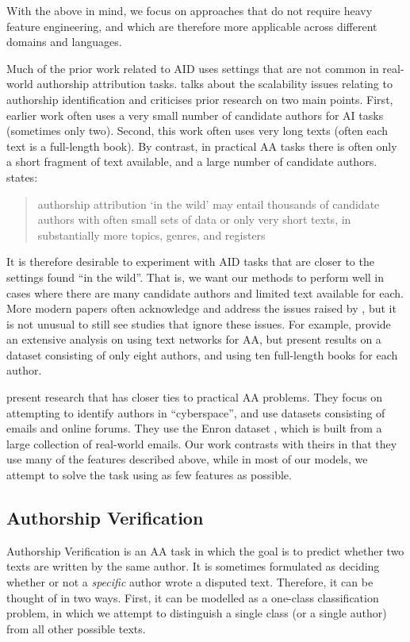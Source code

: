 With the above in mind, we focus on approaches that do not require heavy feature engineering, and which are therefore more applicable across different domains and languages.


Much of the prior work related to AID uses settings that are not common in real-world authorship attribution tasks. \citet{luyckx2011scalability} talks about the scalability issues relating to authorship identification and criticises prior research on two main points. First, earlier work often uses a very small number of candidate authors for AI tasks (sometimes only two). Second, this work often uses very long texts (often each text is a full-length book). By contrast, in practical AA tasks there is often only a short fragment of text available, and a large number of candidate authors. \citeauthor{luyckx2011scalability} states:

\begin{quote}authorship attribution `in the wild' may entail thousands of candidate authors with often small sets of data or only very short texts, in substantially more topics, genres, and registers\end{quote}

It is therefore desirable to experiment with AID tasks that are closer to the settings found ``in the wild''. That is, we want our methods to perform well in cases where there are many candidate authors and limited text available for each. More modern papers often acknowledge and address the issues raised by \citeauthor{luyckx2011scalability}, but it is not unusual to still see studies that ignore these issues. For example, \citet{akimushkin2017role} provide an extensive analysis on using text networks for AA, but present results on a dataset consisting of only eight authors, and using ten full-length books for each author.

\citet{abbasi2008writeprints} present research that has closer ties to practical AA problems. They focus on attempting to identify authors in ``cyberspace'', and use datasets consisting of emails and online forums. They use the Enron dataset \cite{klimt2004enron}, which is built from a large collection of real-world emails. Our work contrasts with theirs in that they use many of the features described above, while in most of our models, we attempt to solve the task using as few features as possible.


\subsection{Authorship Verification}
\label{authorship-verification}
Authorship Verification is an AA task in which the goal is to predict whether two texts are written by the same author. It is sometimes formulated as deciding whether or not a \textit{specific} author wrote a disputed text. Therefore, it can be thought of in two ways. First, it can be modelled as a one-class classification problem, in which we attempt to distinguish a single class (or a single author) from all other possible texts.


